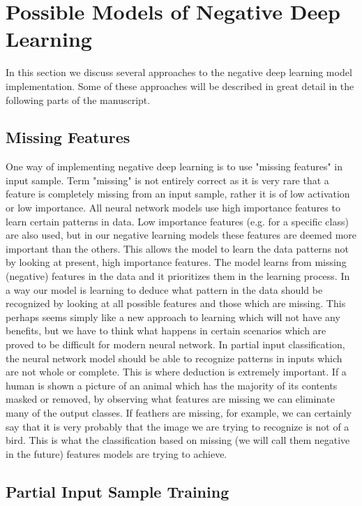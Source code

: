 \documentclass[b5paper]{book}
\let\cite\parencite
\begin{document}
\section{Possible Models of Negative Deep Learning}

In this section we discuss several approaches to the negative deep learning model implementation. Some of these approaches will be described in great detail in the following parts of the manuscript.

\subsection{Missing Features}

One way of implementing negative deep learning is to use "missing features" in input sample. Term "missing" is not entirely correct as it is very rare that a feature is completely missing from an input sample, rather it is of low activation or low importance. All neural network models use high importance features to learn certain patterns in data. Low importance features (e.g. for a specific class) are also used, but in our negative learning models \cite{milovsevic2019classification} these features are deemed more important than the others. This allows the model to learn the data patterns not by looking at present, high importance features. The model learns from missing (negative) features in the data and it prioritizes them in the learning process. In a way our model is learning to deduce what pattern in the data should be recognized by looking at all possible features and those which are missing. This perhaps seems simply like a new approach to learning which will not have any benefits, but we have to think what happens in certain scenarios which are proved to be difficult for modern neural network. In partial input classification, the neural network model should be able to recognize patterns in inputs which are not whole or complete. This is where deduction is extremely important. If a human is shown a picture of an animal which has the majority of its contents masked or removed, by observing what features are missing we can eliminate many of the output classes. If feathers are missing, for example, we can certainly say that it is very probably that the image we are trying to recognize is not of a bird. This is what the classification based on missing (we will call them negative in the future) features models are trying to achieve.

\subsection{Partial Input Sample Training}
\end{document}
